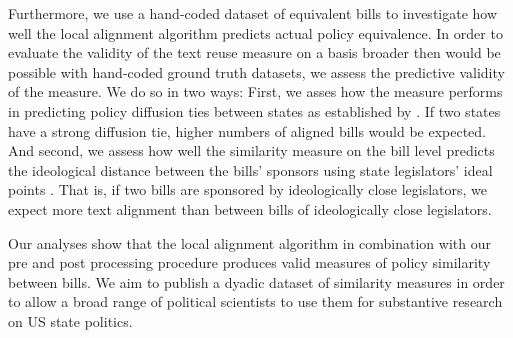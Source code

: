 \documentclass[12pt]{article} %
\begin{document}
Furthermore, we use a hand-coded dataset of equivalent bills to investigate how well the local alignment algorithm predicts actual policy equivalence. In order to evaluate the validity of the text reuse measure on a basis broader then would be possible with hand-coded ground truth datasets, we assess the predictive validity of the measure. We do so in two ways: First, we asses how the measure performs in predicting policy diffusion ties between states as established by \citet{desmarais2015}. If two states have a strong diffusion tie, higher numbers of aligned bills would be expected. And second, we assess how well the similarity measure on the bill level predicts the ideological distance between the bills' sponsors using state legislators' ideal points \citep{shor2011}. That is, if two bills are sponsored by ideologically close legislators, we expect more text alignment than between bills of ideologically close legislators. 

Our analyses show that the local alignment algorithm in combination with our pre and post processing procedure produces valid measures of policy similarity between bills. We aim to publish a dyadic dataset of similarity measures in order to allow a broad range of political scientists to use them for substantive research on US state politics. 

\clearpage



\end{document}
